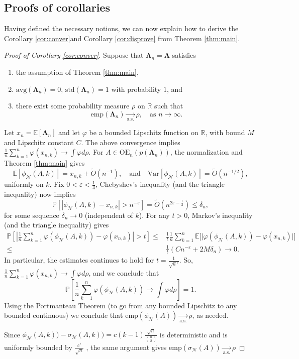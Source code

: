 \documentclass[reqno]{amsart}
\numberwithin{equation}{section}
\renewcommand\P{\mathbb{P}}
\newcommand\E{\mathbb{E}}
\newcommand\R{\mathbb{R}}
\newcommand\eps{\varepsilon}
\begin{document}
\subsection{Proofs of corollaries}
Having defined the necessary notions, we can now explain how to derive the Corollary \ref{cor:conver}and Corollary \ref{cor:disprove} from Theorem \ref{thm:main}.
\begin{proof}[Proof of Corollary \ref{cor:conver}]
Suppose that $\bm{\Lambda}_n = \bm{\Lambda}$ satisfies
\begin{enumerate}
    \item  the assumption of Theorem \ref{thm:main},
    \item $\mathrm{avg}(\bm{\Lambda}_{n}) = 0$, $\mathrm{std}(\bm{\Lambda}_n) = 1$ with probability $1$, and
    \item there exist some probability measure $\rho$ on $\R$ such that
$$\mathrm{emp}(\bm{\Lambda}_n) \underset{\mathrm{a.s.}}{\longrightarrow} \rho, \quad \text{as $n\to\infty$}.$$
\end{enumerate}
Let $x_n=\E[\bm{\Lambda}_{n}]$ and let $\varphi$ be a bounded Lipschitz function on $\R$, with bound $M$ and Lipschitz constant $C$. The above convergence implies $\frac{1}{n}\sum_{k=1}^{n}\varphi(x_{n,k})\to\int\varphi d\rho$. For $A\in\mathrm{OE}_n(p(\bm{\Lambda}_n))$, the normalization and Theorem \ref{thm:main} gives \begin{equation*}
    \E \left[\phi_{\mathcal{N}}(A,k)\right] =  x_{n,k}  + \tilde O\left(n^{-1}\right),\quad\text{and}\quad \mathrm{Var}\left[\phi_{\mathcal{N}}(A,k)\right]=\tilde O\left(n^{-1/2}\right),
\end{equation*}
uniformly on $k$.
Fix $0<\eps<\frac{1}{4}$, Chebyshev's inequality (and the triangle inequality) now implies  $$\P[|\phi_{\mathcal{N}}(A,k)-x_{n,k}|>n^{-\eps}]=\tilde{O}(n^{2\eps-\frac{1}{2}})\le \delta_{n},$$
for some sequence $\delta_{n}\to 0$ (independent of $k$). For any $t>0$, Markov's inequality (and the triangle inequality) gives
\begin{align*}
    \P\left[\left|\frac{1}{n}\sum_{k=1}^n\varphi(\phi_{\mathcal{N}}(A,k))-\varphi(x_{n,k})\right|>t\right]\le & \frac{1}{t}\frac{1}{n}\sum_{k=1}^n\E\bigg[\big|\varphi(\phi_{\mathcal{N}}(A,k))-\varphi(x_{n,k})\big|\bigg]\\
    \le & \frac{1}{t}(Cn^{-\eps}+2M\delta_{n})\to 0.    
\end{align*}
In particular, the estimates continues to hold for $t = \frac{1}{\sqrt{n}^\eps}$. So, $\frac{1}{n}\sum_{k=1}^{n}\varphi(x_{n,k})\to\int\varphi d\rho$, and we conclude that
\[\P\left[\frac{1}{n}\sum_{k=1}^n\varphi(\phi_{\mathcal{N}}(A,k))\to \int\varphi d\rho\right]=1.\]
Using the Portmanteau Theorem (to go from any bounded Lipschitz to any bounded continuous) we conclude that $\mathrm{emp}(\phi_{\mathcal{N}}(A)) \underset{\mathrm{a.s.}}{\longrightarrow} \rho$, as needed. 

Since $\phi_{\mathcal{N}}(A,k))-\sigma_{\mathcal{N}}(A,k))=c(k-1)\frac{\sqrt{n}}{{n \choose 2}}$ is deterministic and is uniformly bounded by $\frac{c'}{\sqrt{n}}$ , the same argument gives $\mathrm{emp}(\sigma_{\mathcal{N}}(A)) \underset{\mathrm{a.s.}}{\longrightarrow} \rho$
\end{proof}
\end{document}
